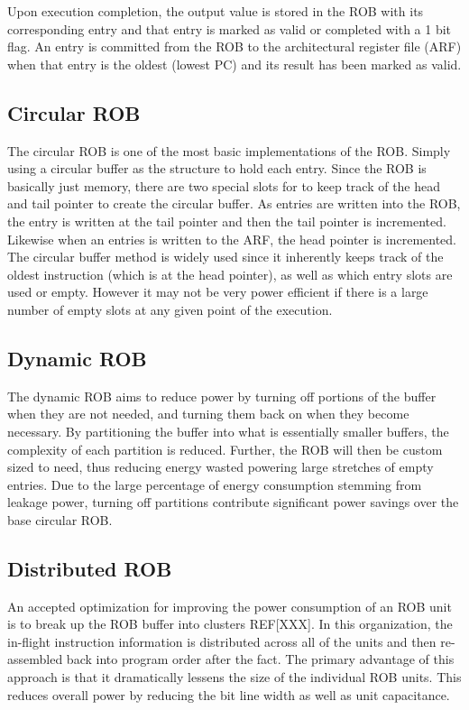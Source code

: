 \documentclass{acm_proc_article-sp}
\begin{document}
Upon execution completion, the output value is stored in the ROB with its 
corresponding entry and that entry is marked as valid or completed with a 
1 bit flag.  An entry is committed from the ROB to the architectural register
file (ARF) when that entry is the oldest (lowest PC) and its result has been 
marked as valid. 
\subsection{Circular ROB}
The circular ROB is one of the most basic implementations of the ROB.  Simply using
a circular buffer as the structure to hold each entry.  Since the ROB is basically
just memory, there are two special slots for to keep track of the head and tail
pointer to create the circular buffer.  As entries are written into the ROB, the
entry is written at the tail pointer and then the tail pointer is incremented.
Likewise when an entries is written to the ARF, the head pointer is incremented.
The circular buffer method is widely used since it inherently keeps track of the 
oldest instruction (which is at the head pointer), as well as which entry slots
are used or empty.   However it may not be very power efficient if there is a large
number of empty slots at any given point of the execution.    
\subsection{Dynamic ROB}
The dynamic ROB aims to reduce power by turning off portions of the buffer when they
are not needed, and turning them back on when they become necessary. By partitioning
the buffer into what is essentially smaller buffers, the complexity of each partition
is reduced. Further, the ROB will then be custom sized to need, thus reducing energy
wasted powering large stretches of empty entries. Due to the large percentage of energy
consumption stemming from leakage power, turning off partitions contribute significant
power savings over the base circular ROB.

\subsection{Distributed ROB}
An accepted optimization for improving the power consumption of an ROB unit 
is to break up the ROB buffer into clusters REF[XXX].  In this organization, the in-flight 
instruction information is distributed across all of the units and then re-assembled 
back into program order after the fact.  The primary advantage of this approach 
is that it dramatically lessens the size of the individual ROB units.  This reduces overall
power by reducing the bit line width as well as unit capacitance.
\end{document}
